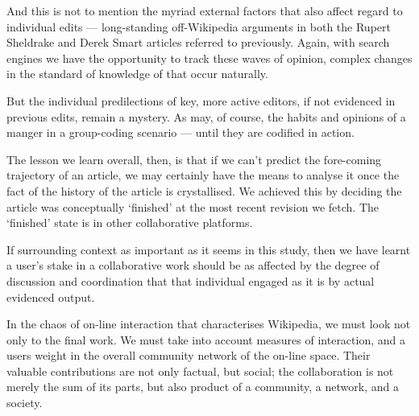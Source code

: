 And this is not to mention the myriad external factors that also
affect regard to individual edits --- long-standing off-Wikipedia
arguments in both the Rupert Sheldrake and Derek Smart articles
referred to previously. Again, with search engines we have the
opportunity to track these waves of opinion, complex changes in the
standard of knowledge of that occur naturally. 

But the individual predilections of key, more active editors, if not
evidenced in previous edits, remain a mystery. As may, of course, the
habits and opinions of a manger in a group-coding scenario --- until
they are codified in action.

The lesson we learn overall, then, is that if we can't predict the
fore-coming trajectory of an article, we may certainly have the means
to analyse it once the fact of the history of the article is
crystallised. We achieved this by deciding the article was
conceptually `finished' at the most recent revision we fetch. The
`finished' state is in other collaborative platforms.

If surrounding context as important as it seems in this study, then we
have learnt a user's stake in a collaborative work should be as
affected by the degree of discussion and coordination that that
individual engaged as it is by actual evidenced output.

In the chaos of on-line interaction that characterises Wikipedia, we
must look not only to the final work. We must take into account
measures of interaction, and a users weight in the overall community
network of the on-line space. Their valuable contributions are not only
factual, but social; the collaboration is not merely the sum of its
parts, but also product of a community, a network, and a society.  





